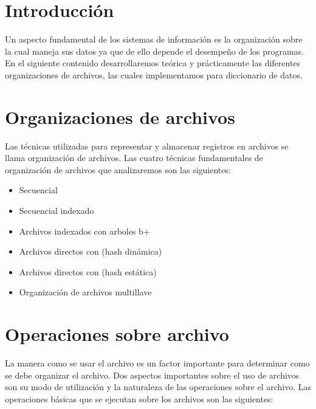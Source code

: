 \chapter[Introducción]{Introducción}

Un aspecto fundamental de los sistemas de información es la organización sobre la cual maneja sus datos ya que de ello depende el desempeño de los programas. En el siguiente contenido desarrollaremos teórica y prácticamente las diferentes organizaciones de archivos, las cuales implementamos para diccionario de datos.


\chapter[Organizaciones de archivos]{Organizaciones de archivos}

Las técnicas utilizadas para representar y almacenar registros en archivos se llama organización de archivos. Las cuatro técnicas fundamentales de organización de archivos que analizaremos son las siguientes:
\begin{itemize}
\item Secuencial 
\item Secuencial indexado
\item Archivos indexados con arboles b+
\item Archivos directos con (hash dinámica)
\item Archivos directos con (hash estática)
\item Organización de archivos multillave
\end{itemize}

\chapter[Operaciones sobre archivo]{Operaciones sobre archivo}

La manera como se usar el archivo es un factor importante para determinar como se debe organizar el archivo. Dos aspectos importantes sobre el uso de archivos son su modo de utilización y la naturaleza de las operaciones sobre el archivo.
Las operaciones básicas que se ejecutan sobre los archivos son las siguientes:

